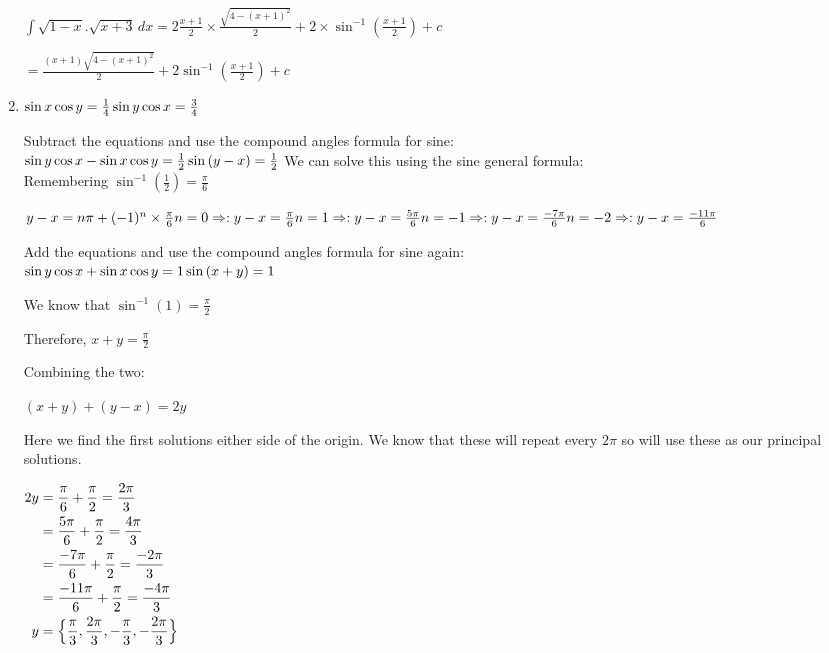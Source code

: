 \documentclass[../main.tex]{subfiles}
\begin{document}
\begin{enumerate}
    \(\int \sqrt{1-x}.\sqrt{x+3}\,dx=2\frac{x+1}{2}\times \frac{\sqrt{4-(x+1)^2}}{2}+2\times \sin^{-1}{(\frac{x+1}{2})}+c\)

    \(=\frac{(x+1)\sqrt{4-(x+1)^2}}{2}+2\sin^{-1}{(\frac{x+1}{2})}+c\)
    
    \item 
    $
    \sin{x}\cos{y}=\frac{1}{4}\\
    \sin{y}\cos{x}=\frac{3}{4}
    $

    Subtract the equations and use the compound angles formula for sine:\\
    $
    \sin{y}\cos{x}-\sin{x}\cos{y}=\frac{1}{2}\\
    \sin{(y-x)}=\frac{1}{2}\\
    $
    We can solve this using the sine general formula:\\
    Remembering \(\sin^{-1}{(\frac{1}{2})}=\frac{\pi}{6}\)

    \(y-x=n\pi + (-1)^n\times \frac{\pi}{6}\\
    n=0 \Rightarrow : y-x = \frac{\pi}{6}\\
    n=1 \Rightarrow : y-x = \frac{5\pi}{6}\\
    n=-1 \Rightarrow : y-x = \frac{-7\pi}{6}\\
    n=-2 \Rightarrow : y-x = \frac{-11\pi}{6}\\
    \)
    
    Add the equations and use the compound angles formula for sine again:\\
    \(\sin{y}\cos{x}+\sin{x}\cos{y}=1\\
    \sin{(x+y)}=1\)

    We know that \(\sin^{-1}{(1)}=\frac{\pi}{2}\)

    Therefore, \(x+y=\frac{\pi}{2}\)

    Combining the two:

    \((x+y)+(y-x)=2y\)

    Here we find the first solutions either side of the origin. We know that these will repeat every \(2\pi\) so will use these as our principal solutions.

    $
    \!
    \begin{aligned}[t]
        2y
        &=\frac{\pi}{6}+\frac{\pi}{2}=\frac{2\pi}{3}\\
        &=\frac{5\pi}{6}+\frac{\pi}{2}=\frac{4\pi}{3}\\
        &=\frac{-7\pi}{6}+\frac{\pi}{2}=\frac{-2\pi}{3}\\
        &=\frac{-11\pi}{6}+\frac{\pi}{2}=\frac{-4\pi}{3}\\
        y &= \Bigl\{\frac{\pi}{3},\frac{2\pi}{3},-\frac{\pi}{3},-\frac{2\pi}{3}\Bigr\}
    \end{aligned}
    $


\end{enumerate}
\end{document}
